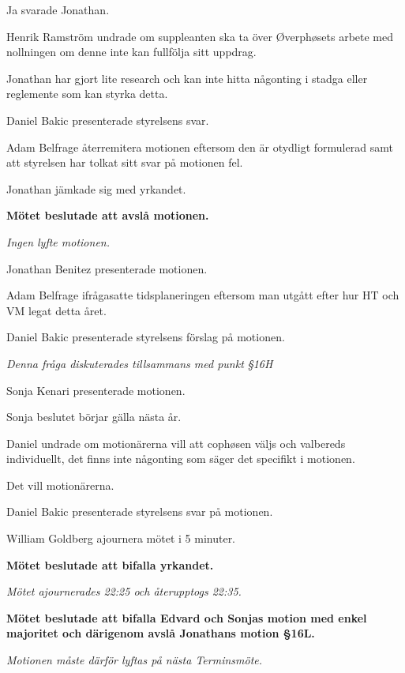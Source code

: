 \documentclass[10pt]{article}
\begin{document}
\begin{paragrafer}
\begin{paragrafer}
		Ja svarade Jonathan.
		
		Henrik Ramström undrade om suppleanten ska ta över Øverphøsets arbete med nollningen om denne inte kan fullfölja sitt uppdrag. 
		
		Jonathan har gjort lite research och kan inte hitta någonting i stadga eller reglemente som kan styrka detta.

		Daniel Bakic presenterade styrelsens svar. 

		Adam Belfrage \ypa återremitera motionen eftersom den är otydligt formulerad samt att styrelsen har tolkat sitt svar på motionen fel.

		Jonathan jämkade sig med yrkandet.

		\textbf{Mötet beslutade att avslå motionen.}


		\emph{Ingen lyfte motionen.}



		Jonathan Benitez presenterade motionen. 

		Adam Belfrage ifrågasatte tidsplaneringen eftersom man utgått efter hur HT och VM legat detta året. 

		Daniel Bakic presenterade styrelsens förslag på motionen. 

		\emph{Denna fråga diskuterades tillsammans med punkt \S16H}

		Sonja Kenari presenterade motionen.

		Sonja \ypa beslutet börjar gälla nästa år. 
		
		Daniel undrade om motionärerna vill att cophøsen väljs och valbereds individuellt, det finns inte någonting som säger det specifikt i motionen.

		Det vill motionärerna.

		Daniel Bakic presenterade styrelsens svar på motionen. 

		William Goldberg \ypa ajournera mötet i 5 minuter.
		
		\textbf{Mötet beslutade att bifalla yrkandet.}

		\emph{Mötet ajournerades 22:25 och återupptogs 22:35.}

		\textbf{Mötet beslutade att bifalla Edvard och Sonjas motion med enkel majoritet och därigenom avslå Jonathans motion \S16L. }
	
		\emph{Motionen måste därför lyftas på nästa Terminsmöte.}		


\end{paragrafer}
\end{paragrafer}
\end{document}
